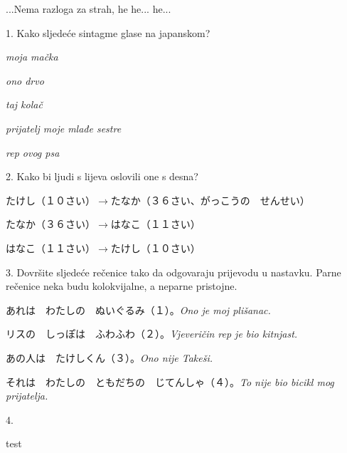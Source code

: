 
\author{Marko Miličić, Tomislav Mamić}

	
	...Nema razloga za strah, he he... he...
	
	\begin{mondai}{1. Kako sljedeće sintagme glase na japanskom?}
		\item \textit{moja mačka}
		\item \textit{ono drvo}
		\item \textit{taj kolač}
		\item \textit{prijatelj moje mlađe sestre}
		\item \textit{rep ovog psa}
	\end{mondai}

	\begin{mondai}{2. Kako bi ljudi s lijeva oslovili one s desna?}
		\item たけし（１０さい）$\rightarrow$たなか（３６さい、がっこうの　せんせい）
		\item たなか（３６さい）$\rightarrow$はなこ（１１さい）
		\item はなこ（１１さい）$\rightarrow$たけし（１０さい）
		
	\end{mondai}

	\begin{mondai}{3. Dovršite sljedeće rečenice tako da odgovaraju prijevodu u nastavku. Parne rečenice neka budu kolokvijalne, a neparne pristojne.}
		\item あれは　わたしの　ぬいぐるみ（１）。\textit{Ono je moj plišanac.}
		\item リスの　しっぽは　ふわふわ（２）。\textit{Vjeveričin rep je bio kitnjast.}
		\item あの人は　たけしくん（３）。\textit{Ono nije Takeši.}
		\item それは　わたしの　ともだちの　じてんしゃ（４）。\textit{To nije bio bicikl mog prijatelja.}
	\end{mondai}

	\begin{mondai}{4. }
		\item test
	\end{mondai}
